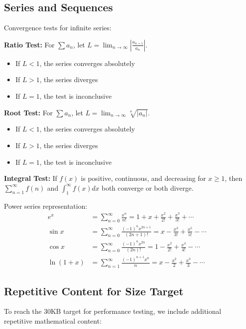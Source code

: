 \documentclass[12pt]{article}
\begin{document}
\subsection{Series and Sequences}

Convergence tests for infinite series:

\textbf{Ratio Test:} For $\sum a_n$, let $L = \lim_{n \to \infty} \left|\frac{a_{n+1}}{a_n}\right|$.
\begin{itemize}
\item If $L < 1$, the series converges absolutely
\item If $L > 1$, the series diverges  
\item If $L = 1$, the test is inconclusive
\end{itemize}

\textbf{Root Test:} For $\sum a_n$, let $L = \lim_{n \to \infty} \sqrt[n]{|a_n|}$.
\begin{itemize}
\item If $L < 1$, the series converges absolutely
\item If $L > 1$, the series diverges
\item If $L = 1$, the test is inconclusive  
\end{itemize}

\textbf{Integral Test:} If $f(x)$ is positive, continuous, and decreasing for $x \geq 1$, then $\sum_{n=1}^{\infty} f(n)$ and $\int_1^{\infty} f(x) dx$ both converge or both diverge.

Power series representation:
\begin{align}
e^x &= \sum_{n=0}^{\infty} \frac{x^n}{n!} = 1 + x + \frac{x^2}{2!} + \frac{x^3}{3!} + \cdots \\
\sin x &= \sum_{n=0}^{\infty} \frac{(-1)^n x^{2n+1}}{(2n+1)!} = x - \frac{x^3}{3!} + \frac{x^5}{5!} - \cdots \\
\cos x &= \sum_{n=0}^{\infty} \frac{(-1)^n x^{2n}}{(2n)!} = 1 - \frac{x^2}{2!} + \frac{x^4}{4!} - \cdots \\
\ln(1+x) &= \sum_{n=1}^{\infty} \frac{(-1)^{n+1} x^n}{n} = x - \frac{x^2}{2} + \frac{x^3}{3} - \cdots
\end{align}

\subsection{Repetitive Content for Size Target}

To reach the 30KB target for performance testing, we include additional repetitive mathematical content:
\end{document}
